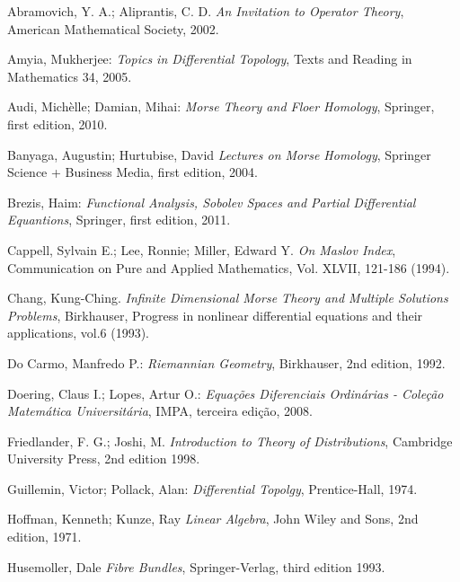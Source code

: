 \documentclass[12pt]{book}
\begin{document}
	
	\begin{thebibliography}{9}
		Abramovich, Y. A.; Aliprantis, C. D.
		\emph{An Invitation to Operator Theory},
		American Mathematical Society, 2002.
		
		Amyia, Mukherjee:
		\emph{Topics in Differential Topology},
		Texts and Reading in Mathematics 34,
		2005.
		
		Audi, Michèlle; Damian, Mihai:
		\emph{Morse Theory and Floer Homology},
		Springer, first edition,
		2010.
		
		Banyaga, Augustin; Hurtubise, David
		\emph{Lectures on Morse Homology},
		Springer Science + Business Media, first edition,
		2004.
		
		Brezis, Haim:
		\emph{Functional Analysis, Sobolev Spaces and Partial Differential Equantions},
		Springer, first edition,
		2011.
		
		Cappell, Sylvain E.; Lee, Ronnie; Miller, Edward Y.
		\emph{On Maslov Index}, Communication on Pure and Applied Mathematics, Vol. XLVII, 121-186 (1994).
		
		Chang, Kung-Ching.
		\emph{Infinite Dimensional Morse Theory and Multiple Solutions Problems}, Birkhauser, Progress in nonlinear differential equations and
		their applications, vol.6 (1993).
		
		Do Carmo, Manfredo P.:
		\emph{Riemannian Geometry},
		Birkhauser, 2nd edition,
		1992.
		
		Doering, Claus I.; Lopes, Artur O.:
		\emph{Equações Diferenciais Ordinárias - Coleção Matemática Universitária},
		IMPA, terceira edição,
		2008.
		
		Friedlander, F. G.; Joshi, M.
		\emph{Introduction to Theory of Distributions},
		Cambridge University Press, 2nd edition
		1998.
		
		Guillemin, Victor; Pollack, Alan:
		\emph{Differential Topolgy},
		Prentice-Hall,
		1974.	
		
		Hoffman, Kenneth; Kunze, Ray
		\emph{Linear Algebra},
		John Wiley and Sons, 2nd edition, 1971.
		
		Husemoller, Dale
		\emph{Fibre Bundles},
		Springer-Verlag, third edition
		1993.
		

\end{thebibliography}
\end{document}

